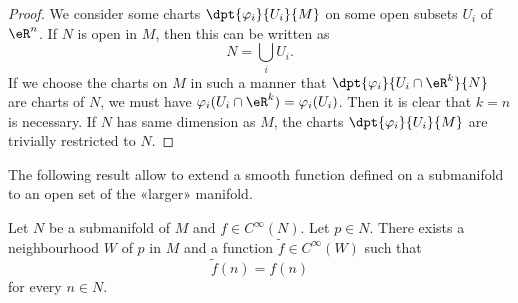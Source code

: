 \begin{proof}
We consider some charts $\dpt{\varphi_i}{U_i}{M}$ on some open subsets $U_i$ of $\eR^n$. If $N$ is open in $M$, then this can be written as
\[
  N=\bigcup_iU_i.
\]
If we choose the charts on $M$ in such a manner that $\dpt{\varphi_i}{U_i\cap \eR^k}{N}$ are charts of $N$, we must have $\varphi_i(U_i\cap\eR^k)=\varphi_i(U_i)$. Then it is clear that $k=n$ is necessary.
If $N$ has same dimension as $M$, the charts $\dpt{\varphi_i}{U_i}{M}$ are trivially restricted to $N$.
\end{proof}

The following result allow to extend a smooth function defined on a submanifold to an open set of the «larger» manifold. 
\begin{proposition}     \label{PROPooOTZQooIfboXV}
    Let \( N\) be a submanifold of \( M\) and \( f\in  C^{\infty}(N)\). Let \( p\in N\). There exists a neighbourhood \( W\) of \( p\) in \( M\) and a function \( \tilde f\in  C^{\infty}(W)\) such that
    \begin{equation}
        \tilde f(n)=f(n)
    \end{equation}
    for every \( n\in N\).
\end{proposition}

